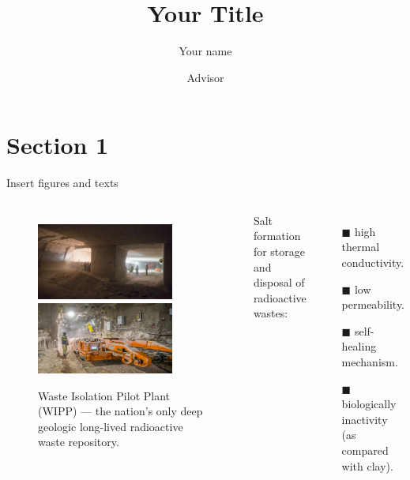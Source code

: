 \documentclass[hyperref={bookmarks=false},aspectratio=169]{beamer}
\title[]
{Your Title}
\author[]
{{Your name}\\
\and Advisor}
\institute[Your Institute]
{
	 Your school\\
  Your institute
}
\date[]
{}
\begin{document}
\frame{\titlepage}  %


\section{Section 1}


\begin{frame}{Insert figures and texts}
\begin{columns}
\vspace{-0.2cm}
\begin{figure}
    \centering
    \includegraphics[width=0.8\textwidth]{Presentation/figures/SaltRockRepo.jpg}
    \includegraphics[width=0.8\textwidth]{Presentation/figures/WIPPsites.jpg}
    \caption{Waste Isolation Pilot Plant (WIPP) --- the nation's only deep geologic long-lived radioactive waste repository.}
\end{figure}
\quad
{}
Salt formation for \textcolor{myblue}{storage and disposal} of radioactive wastes:
\begin{enumerate}
   \item[$\blacksquare$] high thermal conductivity.

    \item[$\blacksquare$] low permeability.

    \item[$\blacksquare$] \textcolor{myred}{self-healing mechanism}.
    
    \item[$\blacksquare$] biologically inactivity (as compared with clay).
\end{enumerate}
\end{columns}
\end{frame}
\end{document}

